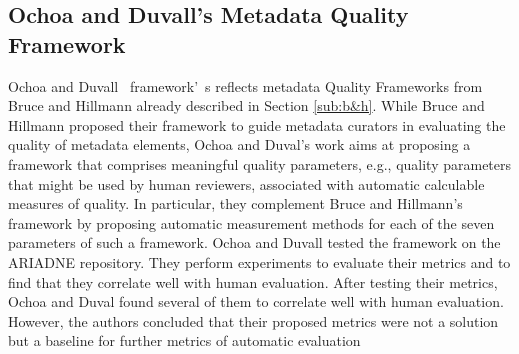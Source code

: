 \documentclass[epsfig,a4paper,12pt,titlepage]{book}
\begin{document}
\subsection{Ochoa and Duvall's Metadata Quality Framework}
\label{sub:o&d}
Ochoa and Duvall~\cite{2} framework'\ s reflects metadata Quality Frameworks from Bruce and Hillmann already described in Section \ref{sub:b&h}. 
While Bruce and Hillmann proposed their framework to guide metadata curators in evaluating the quality of metadata elements,  Ochoa and Duval's work aims at proposing a framework that comprises meaningful quality parameters, e.g., quality parameters that might be used by human reviewers, associated with automatic calculable measures of quality. In particular, they complement Bruce and Hillmann's framework by proposing automatic measurement methods for each of the seven parameters of such a framework. 
Ochoa and Duvall tested the framework on the ARIADNE repository. They perform experiments to evaluate their metrics and to find that they correlate well with human evaluation. After testing their metrics, Ochoa and Duval found several of them to correlate well with human evaluation. However, the authors concluded that their proposed metrics were not a solution but a baseline for further metrics of automatic evaluation 
\end{document}
